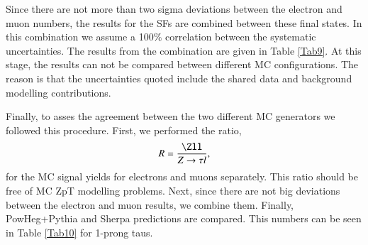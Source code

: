 Since there are not more than two sigma deviations between the electron and muon numbers, the results for the SFs are combined between these final states. In this combination we assume a 100$\%$ correlation between the systematic uncertainties. The results from the combination are given in Table \ref{Tab9}. At this stage, the results can not be compared between different MC configurations. The reason is that the uncertainties quoted include the shared data and background modelling contributions.
\begin{table}[h]
\end{table} 

Finally, to asses the agreement between the two different MC generators we followed this procedure. First, we performed the ratio,
\begin{equation}
R=\frac{\Zll}{Z\to\tau l},
\end{equation}
for the MC signal yields for electrons and muons separately. This ratio should be free of MC ZpT modelling problems. Next, since there are not big deviations between the electron and muon results, we combine them. Finally,  PowHeg+Pythia and Sherpa predictions are compared. This numbers can be seen in Table \ref{Tab10} for 1-prong taus.


